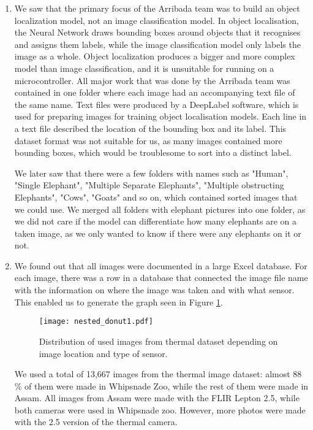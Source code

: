 \begin{enumerate}
    \item We saw that the primary focus of the Arribada team was to build an object localization model, not an image classification model.
In object localisation, the Neural Network draws bounding boxes around objects that it recognises and assigns them labels, while the image classification model only labels the image as a whole.
Object localization produces a bigger and more complex model than image classification, and it is unsuitable for running on a microcontroller.
All major work that was done by the Arribada team was contained in one folder where each image had an accompanying text file of the same name.
Text files were produced by a DeepLabel software, which is used for preparing images for training object localisation models.
Each line in a text file described the location of the bounding box and its label.
This dataset format was not suitable for us, as many images contained more bounding boxes, which would be troublesome to sort into a distinct label.

We later saw that there were a few folders with names such as "Human", "Single Elephant", "Multiple Separate Elephants", "Multiple obstructing Elephants", "Cows", "Goats" and so on, which contained sorted images that we could use.
We merged all folders with elephant pictures into one folder, as we did not care if the model can differentiate how many elephants are on a taken image, as we only wanted to know if there were any elephants on it or not.

    \item We found out that all images were documented in a large Excel database.
For each image, there was a row in a database that connected the image file name with the information on where the image was taken and with what sensor.
This enabled us to generate the graph seen in Figure \ref{nested_donut1}.

\begin{figure}[ht]
    \centering
    \texttt{[image: nested\_donut1.pdf]} 
    \caption{Distribution of used images from thermal dataset depending on image location and type of sensor.}
    \label{nested_donut1}
\end{figure}

We used a total of 13,667 images from the thermal image dataset: almost 88 \% of them were made in Whipsnade Zoo, while the rest of them were made in Assam.
All images from Assam were made with the FLIR Lepton 2.5, while both cameras were used in Whipsnade zoo.
However, more photos were made with the 2.5 version of the thermal camera.


\end{enumerate}
